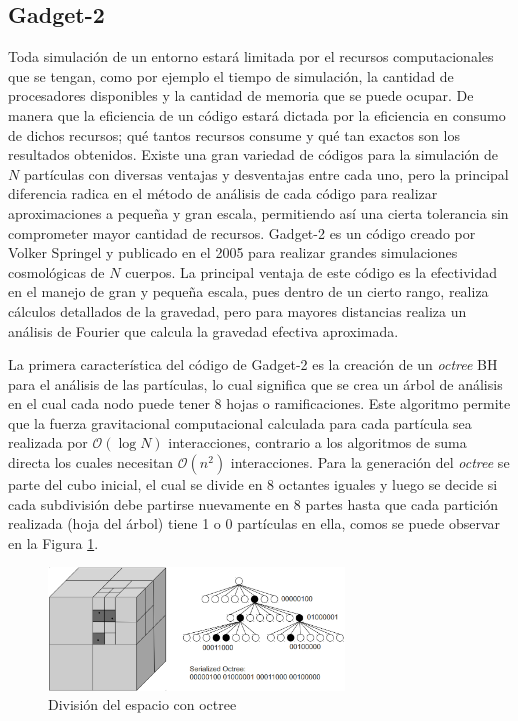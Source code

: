 \subsection{Gadget-2}

Toda simulación de un entorno estará limitada por el recursos computacionales que se tengan, como por ejemplo el tiempo de simulación, la cantidad de procesadores disponibles y la cantidad de memoria que se puede ocupar. De manera que la eficiencia de un código estará dictada por la eficiencia en consumo de dichos recursos; qué tantos recursos consume y qué tan exactos son los resultados obtenidos. Existe una gran variedad de códigos para la simulación de $N$ partículas con diversas ventajas y desventajas entre cada uno, pero la principal diferencia radica en el método de análisis de cada código para realizar aproximaciones a pequeña y gran escala, permitiendo así una cierta tolerancia sin comprometer mayor cantidad de recursos. Gadget-2 es un código creado por Volker Springel y publicado en el 2005\cite{gadget} para realizar grandes simulaciones cosmológicas de $N$ cuerpos. La principal ventaja de este código es la efectividad en el manejo de gran y pequeña escala, pues dentro de un cierto rango, realiza cálculos detallados de la gravedad, pero para mayores distancias realiza un análisis de Fourier que calcula la gravedad efectiva aproximada.

La primera característica del código de Gadget-2 es la creación de un \textit{octree} BH para el análisis de las partículas, lo cual significa que se crea un árbol de análisis en el cual cada nodo puede tener 8 hojas o ramificaciones. Este algoritmo permite que la fuerza gravitacional computacional calculada para cada partícula sea realizada por $\mathcal{O}(\log N)$ interacciones, contrario a los algoritmos de suma directa los cuales necesitan $\mathcal{O}(n^{2})$ interacciones. Para la generación del \textit{octree} se parte del cubo inicial, el cual se divide en 8 octantes iguales y luego se decide si cada subdivisión debe partirse nuevamente en 8 partes hasta que cada partición realizada (hoja del árbol) tiene 1 o 0 partículas en ella, comos se puede observar en la Figura \ref{fig:octree}. 

\begin{figure}[H]
	\centering
	\includegraphics[width=0.7\textwidth]{MarcoTeorico/octree_encode}
	\caption[División del espacio con octree]{División del espacio con octree \footnotemark}
	\label{fig:octree}
\end{figure}

